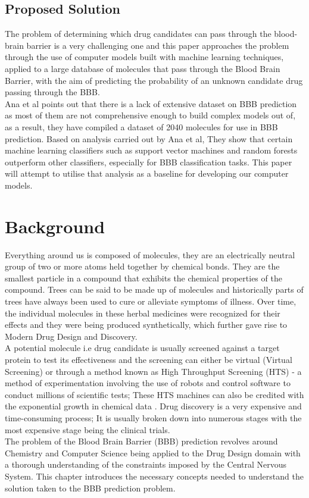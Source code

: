 \documentclass[a4paper,12pt]{report}
\begin{document}
	\section{Proposed Solution}
		The problem of determining which drug candidates can pass through the blood-brain barrier is a very challenging one and this paper approaches the problem through the use of computer models built with machine learning techniques, applied to a large database of molecules that pass through the Blood Brain Barrier, with the aim of predicting the probability of an unknown candidate drug passing through the BBB. \\
		Ana et al \cite{Anaetal2012} points out that there is a lack of extensive dataset on BBB prediction as most of them are not comprehensive enough to build complex models out of, as a result, they have compiled a dataset of 2040 molecules for use in BBB prediction. Based on analysis carried out \cite{Anaetal2012} by Ana et al, They show that certain machine learning classifiers such as support vector machines and random forests outperform other classifiers, especially for BBB classification tasks. This paper will attempt to utilise that analysis as a baseline for developing our computer models.


\chapter{Background}
	Everything around us is composed of molecules, they are an electrically neutral group of two or more atoms held together by chemical bonds. They are the smallest particle in a compound that exhibits the chemical properties of the compound. 
	Trees can be said to be made up of molecules and historically parts of trees have always been used to cure or alleviate symptoms of illness. Over time, the individual molecules in these herbal medicines were recognized for their effects and they were being produced synthetically, which further gave rise to Modern Drug Design and Discovery. \\
	A potential molecule i.e drug candidate is usually screened against a target protein to test its effectiveness and the screening can either be virtual (Virtual Screening) or through a method known as High Throughput Screening (HTS) - a method of experimentation involving the use of robots and control software to conduct millions of scientific tests; These HTS machines can also be credited with the exponential growth in chemical data \cite{Dougetal2008}.
	Drug discovery is a very expensive and time-consuming process; It is usually broken down into numerous stages with the most expensive stage being the clinical trials. \\
	The problem of the Blood Brain Barrier (BBB) prediction revolves around Chemistry and Computer Science being applied to the Drug Design domain with a thorough understanding of the constraints imposed by the Central Nervous System. This chapter introduces the necessary concepts needed to understand the solution taken to the BBB prediction problem.
	
\end{document}
